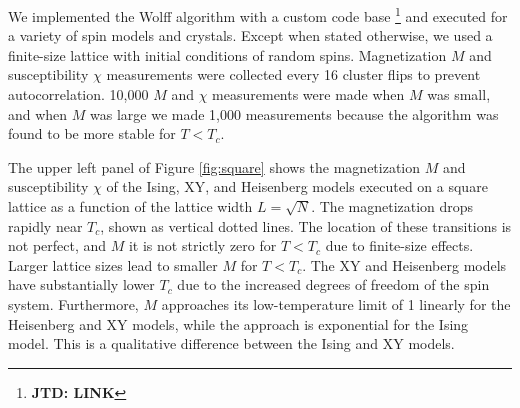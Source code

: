 \documentclass[amsmath,amssymb,aps,twocolumn,nofootinbib]{revtex4-2}
\newcommand{\jtd}[1]{{\color{red}\textbf{JTD: #1}}}
\begin{document}
We implemented the Wolff algorithm with a custom code base \footnote{\jtd{LINK}} and executed for a variety of spin models and crystals. Except when stated otherwise, we used a finite-size lattice with initial conditions of random spins. Magnetization $M$ and susceptibility $\chi$ measurements were collected every 16 cluster flips to prevent autocorrelation. 10,000 $M$ and $\chi$ measurements were made when $M$ was small, and when $M$ was large we made 1,000 measurements because the algorithm was found to be more stable for $T< T_c$.

The upper left panel of Figure \ref{fig:square} shows the magnetization $M$ and susceptibility $\chi$ of the Ising, XY, and Heisenberg models executed on a square lattice as a function of the lattice width $L = \sqrt{N}$. The magnetization drops rapidly near $T_c$, shown as vertical dotted lines. The location of these transitions is not perfect, and $M$ it is not strictly zero for $T<T_c$ due to finite-size effects. Larger lattice sizes lead to smaller $M$ for $T<T_c$. The XY and Heisenberg models have substantially lower $T_c$ due to the increased degrees of freedom of the spin system. Furthermore, $M$ approaches its low-temperature limit of 1 linearly for the Heisenberg and XY models, while the approach is exponential for the Ising model. This is a qualitative difference between the Ising and XY models.
\end{document}
